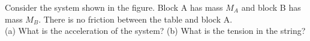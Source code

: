 Consider the system shown in the figure. Block A has mass $M_A$
and block B has mass $M_B$. There is no friction between the table
and block A.\\
%
(a) What is the acceleration of the system?\hwendpart
%
(b) What is the tension in the string?
